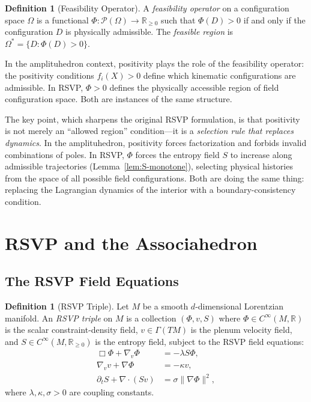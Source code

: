 \documentclass[12pt, oneside]{amsart}
\theoremstyle{plain}
\theoremstyle{definition}
\newtheorem{definition}[theorem]{Definition}
\theoremstyle{remark}
\newcommand{\R}{\mathbb{R}}
\newcommand{\Phif}{\Phi}   %
\newcommand{\vf}{v}         %
\newcommand{\Sf}{S}         %
\newcommand{\OmKS}{\Omega}
\begin{document}
\begin{definition}[Feasibility Operator]
\label{def:feasibility}
A \emph{feasibility operator} on a configuration space $\OmKS$ is a functional $\Phif: \mathcal{P}(\OmKS) \to \R_{\geq 0}$ such that $\Phif(D) > 0$ if and only if the configuration $D$ is physically admissible. The \emph{feasible region} is $\OmKS^* = \{D : \Phif(D) > 0\}$.
\end{definition}

In the amplituhedron context, positivity plays the role of the feasibility operator: the positivity conditions $f_i(X) > 0$ define which kinematic configurations are admissible. In RSVP, $\Phif > 0$ defines the physically accessible region of field configuration space. Both are instances of the same structure.

The key point, which sharpens the original RSVP formulation, is that positivity is not merely an ``allowed region'' condition---it is a \emph{selection rule that replaces dynamics}. In the amplituhedron, positivity forces factorization and forbids invalid combinations of poles. In RSVP, $\Phif$ forces the entropy field $\Sf$ to increase along admissible trajectories (Lemma~\ref{lem:S-monotone}), selecting physical histories from the space of all possible field configurations. Both are doing the same thing: replacing the Lagrangian dynamics of the interior with a boundary-consistency condition.

\section{RSVP and the Associahedron}
\label{sec:rsvp}

\subsection{The RSVP Field Equations}

\begin{definition}[RSVP Triple]
\label{def:rsvp}
Let $M$ be a smooth $d$-dimensional Lorentzian manifold. An \emph{RSVP triple} on $M$ is a collection $(\Phif, \vf, \Sf)$ where $\Phif \in C^\infty(M, \R)$ is the scalar constraint-density field, $\vf \in \Gamma(TM)$ is the plenum velocity field, and $\Sf \in C^\infty(M, \R_{\geq 0})$ is the entropy field, subject to the RSVP field equations:
\begin{align}
  \Box \Phif + \nabla_\vf \Phif &= -\lambda \Sf \Phif, \label{eq:phi}\\
  \nabla_\vf \vf + \nabla \Phif &= -\kappa \vf, \label{eq:v}\\
  \partial_t \Sf + \nabla \cdot (\Sf \vf) &= \sigma \|\nabla \Phif\|^2, \label{eq:S}
\end{align}
where $\lambda, \kappa, \sigma > 0$ are coupling constants.
\end{definition}
\end{document}
